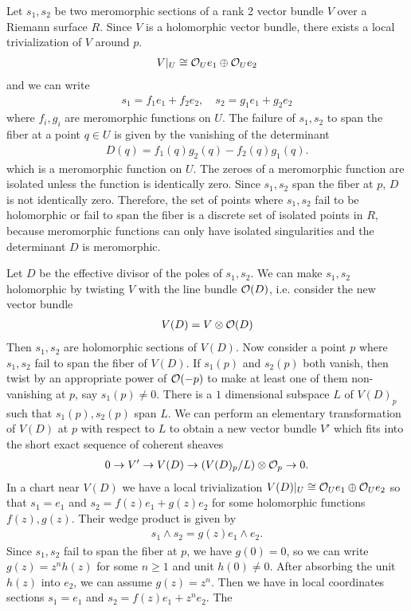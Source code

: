 \documentclass[12pt]{article}  %
\begin{document}
\begin{solution}
    Let $s_1, s_2$ be two meromorphic sections of a rank 2 vector bundle $V$ over a Riemann surface $R$. Since $V$ is a holomorphic vector bundle, there exists a local trivialization of $V$ around $p$. \begin{align*}
        V|_U \cong {\mathcal{O}}_U e_1 \oplus {\mathcal{O}}_U e_2
    \end{align*} and we can write \begin{align*}
        s_1 = f_1 e_1 + f_2 e_2, \quad s_2 = g_1 e_1 + g_2 e_2
    \end{align*} where $f_i, g_i$ are meromorphic functions on $U$. The failure of $s_1, s_2$ to span the fiber at a point $q \in U$ is given by the vanishing of the determinant \begin{align*}
        D(q) = f_1(q)g_2(q) - f_2(q)g_1(q).
    \end{align*} which is a meromorphic function on $U$. The zeroes of a meromorphic function are isolated unless the function is identically zero. Since $s_1, s_2$ span the fiber at $p$, $D$ is not identically zero. Therefore, the set of points where $s_1, s_2$ fail to be holomorphic or fail to span the fiber is a discrete set of isolated points in $R$, because meromorphic functions can only have isolated singularities and the determinant $D$ is meromorphic.

    Let $D$ be the effective divisor of the poles of $s_1, s_2$. We can make $s_1, s_2$ holomorphic by twisting $V$ with the line bundle ${\mathcal{O}}(D)$, i.e. consider the new vector bundle \begin{align*}
        V(D) = V \otimes {\mathcal{O}}(D)\end{align*} Then $s_1, s_2$ are holomorphic sections of $V(D)$. Now consider a point $p$ where $s_1, s_2$ fail to span the fiber of $V(D)$. If $s_1(p)$ and $s_2(p)$ both vanish, then twist by an appropriate power of ${\mathcal{O}}(-p)$ to make at least one of them non-vanishing at $p$, say $s_1(p) \neq 0$. There is a $1$ dimensional subspace $L$ of $V(D)_p$ such that $s_1(p), s_2(p)$ span $L$. We can perform an elementary transformation of $V(D)$ at $p$ with respect to $L$ to obtain a new vector bundle $V'$ which fits into the short exact sequence of coherent sheaves \begin{align}
        0 \to V' \to V(D) \to (V(D)_p/L) \otimes {\mathcal{O}}_p \to 0.
    \end{align} 
    In a chart near $V(D)$ we have a local trivialization $V(D)|_U \cong {\mathcal{O}}_U e_1 \oplus {\mathcal{O}}_U e_2$ so that $s_1 = e_1$ and $s_2 = f(z)e_1 + g(z)e_2$ for some holomorphic functions $f(z), g(z)$. Their wedge product is given by \begin{align*}
        s_1 \wedge s_2 = g(z) e_1 \wedge e_2.
    \end{align*} Since $s_1, s_2$ fail to span the fiber at $p$, we have $g(0) = 0$, so we can write $g(z) = z^n h(z)$ for some $n \geq 1$ and unit $h(0) \neq 0$. After absorbing the unit $h(z)$ into $e_2$, we can assume $g(z) = z^n$. Then we have in local coordinates sections $s_1 = e_1$ and $s_2 = f(z) e_1 + z^n e_2$. The
\end{solution}
\end{document}
